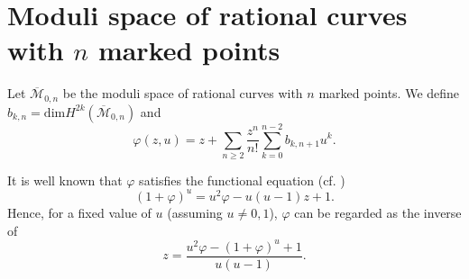 \documentclass[11pt,letterpaper]{amsart}
\numberwithin{equation}{section}
\theoremstyle{definition}
\newcommand{\cal}{\mathcal}
\def\cM{{\cal M}}
\def\mzn{\overline{\cM}_{0,n} }
\def\dim{\mathrm{dim} }
\def\beq{\begin{equation}}
\def\eeq{\end{equation}}
\begin{document}
\section{Moduli space of rational curves with $n$ marked points}\label{sec:mzn}

Let $\mzn$ be the moduli space of rational curves with $n$ marked points. We define $b_{k,n} =\dim H^{2k}(\mzn)$ and
\beq\label{0}\varphi(z,u)=z+\sum_{n\ge 2}\frac{z^n}{n!}\sum_{k=0}^{n-2}b_{k, n+1} u^k. \eeq


It is well known that $\varphi$ satisfies the functional equation (cf. \cite[p.194 Theorem 4.2.1]{Manin})
\beq \label{eq:varphi} (1+\varphi)^u = u^2 \varphi -u(u-1)z +1.
\eeq
Hence, for a fixed value of $u$ (assuming $u \ne 0, 1$), $\varphi$ can be regarded as the inverse of
\beq\label{1} z=\frac{u^2\varphi-(1+\varphi)^u+1}{u(u-1)}.\eeq
\end{document}

